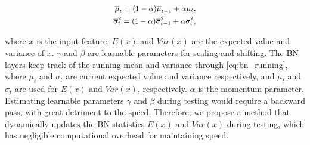 \begin{equation}\small
    \centering
    \label{eq:bn_running}
        \begin{aligned}  
            \overline{\mu}_t = (1-\alpha)  \overline{\mu}_{t-1} +  \alpha  {\mu}_t ,\\
            \overline{\sigma}_{t}^2 = (1-\alpha) \overline{\sigma}_{t-1}^2 +  \alpha {\sigma}_{t}^2 ,
        \end{aligned}
\end{equation}
    
where $x$ is the input feature, $E(x)$ and $Var(x)$ are the expected value and variance of $x$. $\gamma$ and $\beta$ are learnable parameters for scaling and shifting. The BN layers keep track of the running mean and variance through \ref{eq:bn_running}, where ${\mu}_t$ and ${\sigma}_{t}$ are current expected value and variance respectively, and $\overline{\mu}_t$ and $\overline{\sigma}_{t}$ are used for $E(x)$ and $Var(x)$, respectively. $\alpha$ is the momentum parameter. 
Estimating learnable parameters $\gamma$ and $\beta$ during testing would require a backward pass, with great detriment to the speed. Therefore, we propose a method that dynamically updates the BN statistics $E(x)$ and $Var(x)$ during testing, which has negligible computational overhead for maintaining speed.


